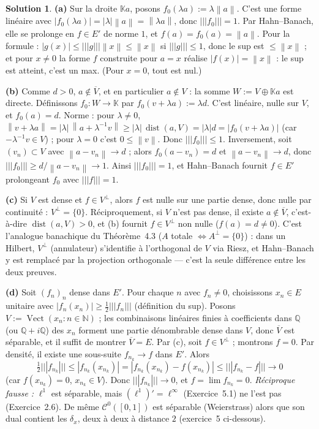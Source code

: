 \documentclass[11pt,a4paper]{article}
\newcommand{\N}{\mathbb{N}}
\newcommand{\Q}{\mathbb{Q}}
\newcommand{\K}{\mathbb{K}}
\newcommand{\adh}[1]{\overline{#1}}
\newcommand{\dist}{\operatorname{dist}}
\newcommand{\Vect}{\operatorname{Vect}}
\newcommand{\norm}[1]{\left\|#1\right\|}
\newcommand{\opnorm}[1]{|\!|\!|#1|\!|\!|}
\newcommand{\Cz}{\mathcal{C}^0}
\newcommand{\ie}{c'est-à-dire}
\theoremstyle{definition}
\newtheorem*{solution}{Solution}
\begin{document}
\begin{solution}
\noindent\textbf{(a)} Sur la droite $\K a$, posons $f_0(\lambda a):=\lambda\norm a$. C'est une forme linéaire avec $|f_0(\lambda a)|=|\lambda|\norm a=\norm{\lambda a}$, donc $\opnorm{f_0}=1$. Par Hahn--Banach, elle se prolonge en $f\in E'$ de norme $1$, et $f(a)=f_0(a)=\norm a$. Pour la formule : $|g(x)|\le\opnorm g\norm x\le\norm x$ si $\opnorm g\le1$, donc le sup est $\le\norm x$ ; et pour $x\ne0$ la forme $f$ construite pour $a=x$ réalise $|f(x)|=\norm x$ : le sup est atteint, c'est un max. (Pour $x=0$, tout est nul.)

\medskip
\noindent\textbf{(b)} Comme $d>0$, $a\notin\adh V$, et en particulier $a\notin V$ : la somme $W:=V\oplus\K a$ est directe. Définissons $f_0:W\to\K$ par $f_0(v+\lambda a):=\lambda d$. C'est linéaire, nulle sur $V$, et $f_0(a)=d$. Norme : pour $\lambda\ne0$, $\norm{v+\lambda a}=|\lambda|\,\norm{a+\lambda^{-1}v}\ge|\lambda|\,\dist(a,V)=|\lambda|d=|f_0(v+\lambda a)|$ (car $-\lambda^{-1}v\in V$) ; pour $\lambda=0$ c'est $0\le\norm v$. Donc $\opnorm{f_0}\le1$. Inversement, soit $(v_n)\subset V$ avec $\norm{a-v_n}\to d$ ; alors $f_0(a-v_n)=d$ et $\norm{a-v_n}\to d$, donc $\opnorm{f_0}\ge d/\norm{a-v_n}\to1$. Ainsi $\opnorm{f_0}=1$, et Hahn--Banach fournit $f\in E'$ prolongeant $f_0$ avec $\opnorm f=1$.

\medskip
\noindent\textbf{(c)} Si $V$ est dense et $f\in V^\perp$, alors $f$ est nulle sur une partie dense, donc nulle par continuité : $V^\perp=\{0\}$. Réciproquement, si $V$ n'est pas dense, il existe $a\notin\adh V$, \ie{} $\dist(a,V)>0$, et (b) fournit $f\in V^\perp$ non nulle ($f(a)=d\ne0$). C'est l'analogue banachique du Théorème~4.3 ($A$ totale $\iff A^\perp=\{0\}$) : dans un Hilbert, $V^\perp$ (annulateur) s'identifie à l'orthogonal de $V$ via Riesz, et Hahn--Banach y est remplacé par la projection orthogonale — c'est la seule différence entre les deux preuves.

\medskip
\noindent\textbf{(d)} Soit $(f_n)_n$ dense dans $E'$. Pour chaque $n$ avec $f_n\ne0$, choisissons $x_n\in E$ unitaire avec $|f_n(x_n)|\ge\frac12\opnorm{f_n}$ (définition du sup). Posons $V:=\Vect(x_n:n\in\N)$ ; les combinaisons linéaires finies à coefficients dans $\Q$ (ou $\Q+i\Q$) des $x_n$ forment une partie dénombrable dense dans $V$, donc $\adh V$ est séparable, et il suffit de montrer $\adh V=E$. Par (c), soit $f\in V^\perp$ ; montrons $f=0$. Par densité, il existe une sous-suite $f_{n_k}\to f$ dans $E'$. Alors
\[
\tfrac12\opnorm{f_{n_k}}\le|f_{n_k}(x_{n_k})|=|f_{n_k}(x_{n_k})-f(x_{n_k})|\le\opnorm{f_{n_k}-f}\to0
\]
(car $f(x_{n_k})=0$, $x_{n_k}\in V$). Donc $\opnorm{f_{n_k}}\to0$, et $f=\lim f_{n_k}=0$. \emph{Réciproque fausse :} $\ell^1$ est séparable, mais $(\ell^1)'=\ell^\infty$ (Exercice~5.1) ne l'est pas (Exercice~2.6). De même $\Cz([0,1])$ est séparable (Weierstrass) alors que son dual contient les $\delta_x$, deux à deux à distance $2$ (exercice~5 ci-dessous).
\end{solution}
\end{document}
